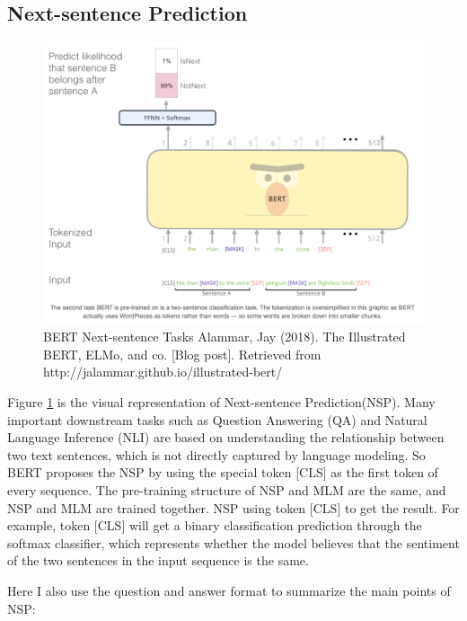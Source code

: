 \documentclass[]{krantz}
\begin{document}
\hypertarget{next-sentence-prediction}{%
\subsection{Next-sentence Prediction}\label{next-sentence-prediction}}

\begin{figure}

{\centering \includegraphics[width=0.7\linewidth]{figures/02-03-transfer-learning-for-nlp/bert_nsp} 

}

\caption{BERT Next-sentence Tasks  
 Alammar, Jay (2018). The Illustrated BERT, ELMo, and co. [Blog post]. Retrieved from http://jalammar.github.io/illustrated-bert/}\label{fig:ch02-03-figure04}
\end{figure}

Figure \ref{fig:ch02-03-figure04} is the visual representation of Next-sentence Prediction(NSP).
Many important downstream tasks such as Question Answering (QA) and Natural Language Inference (NLI) are based on understanding the relationship between two text sentences, which is not directly captured by language modeling. So BERT proposes the NSP by using the special token {[}CLS{]} as the first token of every sequence. The pre-training structure of NSP and MLM are the same, and NSP and MLM are trained together. NSP using token {[}CLS{]} to get the result. For example, token {[}CLS{]} will get a binary classification prediction through the softmax classifier, which represents whether the model believes that the sentiment of the two sentences in the input sequence is the same.

Here I also use the question and answer format to summarize the main points of NSP:
\end{document}
